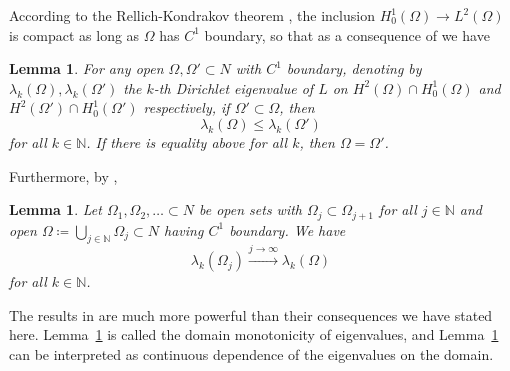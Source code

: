 \documentclass[11pt]{amsart}
\newtheorem{Lemma}[Theorem]{Lemma}
\theoremstyle{definition}
\numberwithin{equation}{section}
\begin{document}
According to the Rellich-Kondrakov theorem \cite[Thm.~2.34]{MR1636569}, the inclusion $H^1_0(\Omega)\to L^2(\Omega)$ is compact as long as $\Omega$ has $C^1$ boundary, so that as a consequence of \cite[Lem.~1.1]{zbMATH01346906} we have
\begin{Lemma}\label{lem:evmon}
    For any open $\Omega, \Omega' \subset N$ with $C^1$ boundary, denoting by $\lambda_k(\Omega),\lambda_k(\Omega')$ the $k$-th Dirichlet eigenvalue of $L$ on $H^2(\Omega)\cap H^1_0(\Omega)$ and $H^2(\Omega')\cap H^1_0(\Omega')$ respectively, if $\Omega'\subset \Omega$, then
    \[
        \lambda_k(\Omega)\leq \lambda_k(\Omega')
    \]
    for all $k\in \mathbb{N}$. If there is equality above for all $k$, then $\Omega = \Omega'$.
\end{Lemma}

Furthermore, by \cite[Thm.~1]{zbMATH01346906},
\begin{Lemma}\label{lem:evcont}
    Let $\Omega_1,\Omega_2,\dots \subset N$ be open sets with $\Omega_j\subset \Omega_{j+1}$ for all $j\in\mathbb{N}$ and open $\Omega\coloneqq \bigcup_{j\in\mathbb{N}} \Omega_j \subset N$ having $C^1$ boundary. We have
    \[
        \lambda_k(\Omega_j) \xrightarrow{j\to\infty} \lambda_k(\Omega)
    \]
    for all $k\in\mathbb{N}$.
\end{Lemma}
The results in \cite{zbMATH01346906} are much more powerful than their consequences we have stated here. %
Lemma~\ref{lem:evmon} is called the domain monotonicity of eigenvalues, and Lemma~\ref{lem:evcont} can be interpreted as continuous dependence of the eigenvalues on the domain. 
\end{document}
